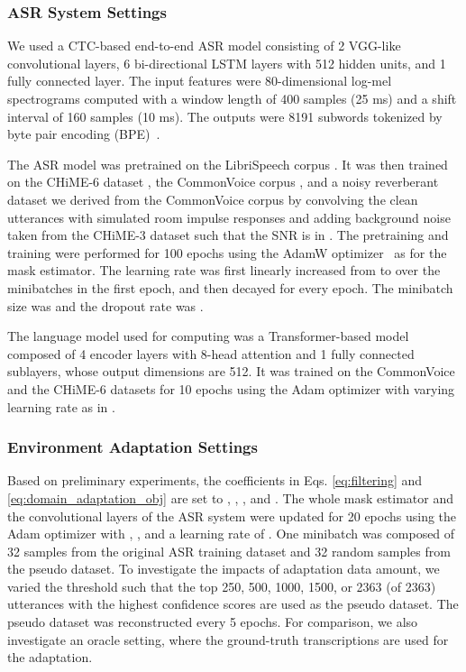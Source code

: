 \documentclass[a4paper]{article}
\begin{document}
\subsubsection{ASR System Settings} \label{sec:asr_system}

We used a CTC-based \cite{graves_connectionist_2006} end-to-end ASR model
consisting of
2 VGG-like convolutional layers,
6 bi-directional LSTM layers with 512 hidden units,
and 1 fully connected layer.
The input features were 80-dimensional log-mel spectrograms
computed with a window length of 400 samples (25 ms)
and a shift interval of 160 samples (10 ms).
The outputs were 8191 subwords tokenized by byte pair encoding (BPE)~\cite{sennrich-etal-2016-neural}.

The ASR model was pretrained on the LibriSpeech corpus \cite{panayotov_librispeech_2015}.
It was then trained on 
the CHiME-6 dataset \cite{watanabe20b_chime},
the CommonVoice corpus \cite{commonvoice:2020},
and a noisy reverberant dataset we derived from the CommonVoice corpus
by convolving the clean utterances with simulated room impulse responses
and adding background noise taken from the CHiME-3 dataset \cite{barker_third_2015}
such that the SNR is in .
The pretraining and training were performed for 100 epochs
using the AdamW optimizer~\cite{loshchilov_decoupled_2019}
as for the mask estimator.
The learning rate was
first linearly increased from  to  over the minibatches in the first epoch,
and then decayed for  every epoch.
The minibatch size was  and the dropout rate was .

The language model used for
computing 
was a Transformer-based model~\cite{NIPS2017_3f5ee243}
composed of 
4 encoder layers with 8-head attention and 1 fully connected sublayers,
whose output dimensions are 512.
It was trained on the CommonVoice and the CHiME-6 datasets
for 10 epochs
using the Adam optimizer
with varying learning rate as in \cite[Sec. 5.3]{NIPS2017_3f5ee243}.

\subsubsection{Environment Adaptation Settings}

Based on preliminary experiments,
the coefficients in Eqs. \eqref{eq:filtering} and \eqref{eq:domain_adaptation_obj} are set to
, , , and
.
The whole mask estimator
and the convolutional layers of the ASR system
were updated for 20 epochs
using the Adam optimizer \cite{DBLP:journals/corr/KingmaB14} with , , and
a learning rate of .
One minibatch was composed of
32 samples from the original ASR training dataset
and 32 random samples from the pseudo dataset.
To investigate the impacts of adaptation data amount,
we varied the threshold  such that
the top 250, 500, 1000, 1500, or 2363 (of 2363) utterances with the highest confidence scores are used as the pseudo dataset.
The pseudo dataset was reconstructed every 5 epochs.
For comparison, we also investigate an oracle setting,
where the ground-truth transcriptions are used for the adaptation.
\end{document}
